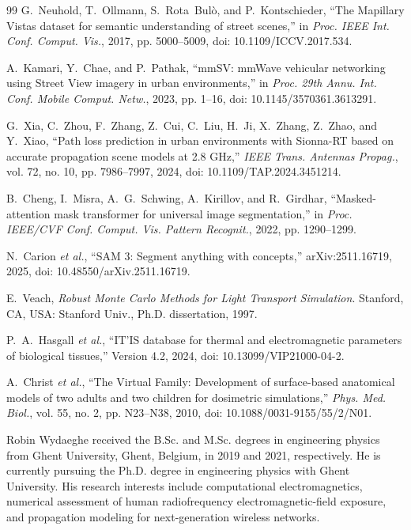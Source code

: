 \documentclass{ieeeaccess}
\begin{document}
\begin{thebibliography}{99}
G.~Neuhold, T.~Ollmann, S.~Rota~Bul\`o, and P.~Kontschieder,
``The Mapillary Vistas dataset for semantic understanding of street scenes,''
in \emph{Proc. IEEE Int. Conf. Comput. Vis.}, 2017, pp. 5000--5009,
doi: 10.1109/ICCV.2017.534.

A.~Kamari, Y.~Chae, and P.~Pathak, ``mmSV: mmWave vehicular networking using
Street View imagery in urban environments,'' in \emph{Proc. 29th Annu. Int.
Conf. Mobile Comput. Netw.}, 2023, pp. 1--16,
doi: 10.1145/3570361.3613291.

G.~Xia, C.~Zhou, F.~Zhang, Z.~Cui, C.~Liu, H.~Ji, X.~Zhang, Z.~Zhao, and
Y.~Xiao, ``Path loss prediction in urban environments with Sionna-RT based on
accurate propagation scene models at 2.8 GHz,'' \emph{IEEE Trans. Antennas
Propag.}, vol. 72, no. 10, pp. 7986--7997, 2024,
doi: 10.1109/TAP.2024.3451214.

B.~Cheng, I.~Misra, A.~G.~Schwing, A.~Kirillov, and R.~Girdhar,
``Masked-attention mask transformer for universal image segmentation,'' in
\emph{Proc. IEEE/CVF Conf. Comput. Vis. Pattern Recognit.}, 2022,
pp. 1290--1299.

N.~Carion \emph{et al.}, ``SAM 3: Segment anything with concepts,''
arXiv:2511.16719, 2025, doi: 10.48550/arXiv.2511.16719.

E.~Veach, \emph{Robust Monte Carlo Methods for Light Transport Simulation}.
Stanford, CA, USA: Stanford Univ., Ph.D. dissertation, 1997.

P.~A.~Hasgall \emph{et al.}, ``IT'IS database for thermal and electromagnetic
parameters of biological tissues,'' Version 4.2, 2024,
doi: 10.13099/VIP21000-04-2.

A.~Christ \emph{et al.}, ``The Virtual Family: Development of surface-based
anatomical models of two adults and two children for dosimetric simulations,''
\emph{Phys. Med. Biol.}, vol. 55, no. 2, pp. N23--N38, 2010,
doi: 10.1088/0031-9155/55/2/N01.

\end{thebibliography}

\begin{IEEEbiographynophoto}{Robin Wydaeghe}
received the B.Sc. and M.Sc. degrees in engineering physics from Ghent
University, Ghent, Belgium, in 2019 and 2021, respectively. He is currently
pursuing the Ph.D. degree in engineering physics with Ghent University. His
research interests include computational electromagnetics, numerical assessment
of human radiofrequency electromagnetic-field exposure, and propagation
modeling for next-generation wireless networks.
\end{IEEEbiographynophoto}
\end{document}
